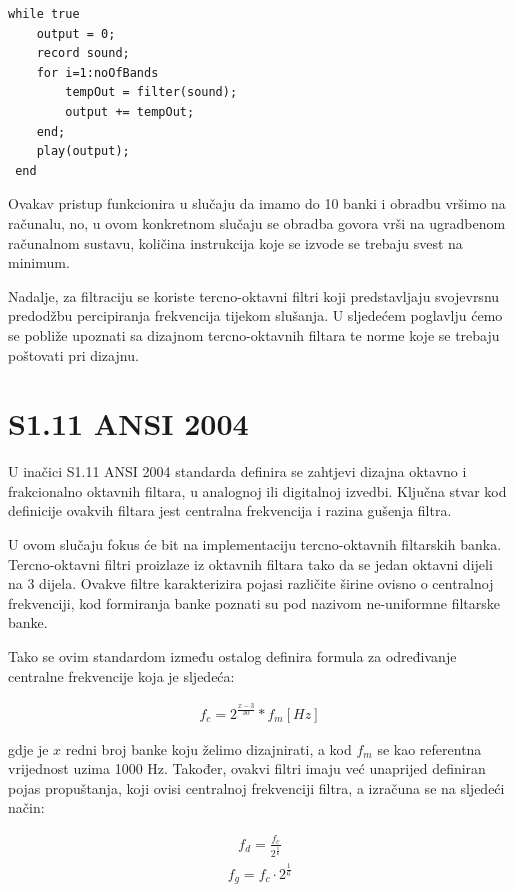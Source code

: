 \documentclass[times, utf8, diplomski]{fer}
\begin{document}
\begin{lstlisting} 
while true
	output = 0;
    record sound;
    for i=1:noOfBands
    	tempOut = filter(sound);
    	output += tempOut;
  	end;
  	play(output);
 end
\end{lstlisting}

Ovakav pristup funkcionira u slučaju da imamo do 10 banki i obradbu vršimo na računalu, no, u ovom konkretnom slučaju se obradba govora vrši na ugradbenom računalnom sustavu, količina instrukcija koje se izvode se trebaju svest na minimum.

Nadalje, za filtraciju se koriste tercno-oktavni filtri koji predstavljaju svojevrsnu predodžbu percipiranja frekvencija tijekom slušanja. U sljedećem poglavlju ćemo se pobliže upoznati sa dizajnom tercno-oktavnih filtara te norme koje se trebaju poštovati pri dizajnu.

\section{S1.11 ANSI 2004}
U inačici S1.11 ANSI 2004 standarda definira se zahtjevi dizajna oktavno i frakcionalno oktavnih filtara, u analognoj ili digitalnoj izvedbi. Ključna stvar kod definicije ovakvih filtara jest centralna frekvencija i razina gušenja filtra.

U ovom slučaju fokus će bit na implementaciju tercno-oktavnih filtarskih banka. Tercno-oktavni filtri proizlaze iz oktavnih filtara tako da se jedan oktavni dijeli na 3 dijela. Ovakve filtre karakterizira pojasi različite širine ovisno o centralnoj frekvenciji, kod formiranja banke poznati su pod nazivom ne-uniformne filtarske banke.

Tako se ovim standardom između ostalog definira formula za određivanje centralne frekvencije koja je sljedeća:

\begin{equation}
\begin{aligned}
f_c = 2^\frac{x-3}{30}*f_m   [Hz]
\end{aligned}
\end{equation}

gdje je $x$ redni broj banke koju želimo dizajnirati, a kod $f_m$ se kao referentna vrijednost uzima 1000 Hz. Također, ovakvi filtri imaju već unaprijed definiran pojas propuštanja, koji ovisi centralnoj frekvenciji filtra, a izračuna se na sljedeći način:

\begin{equation}
\begin{aligned}
f_d = \frac{f_c}{2^\frac{1}{6}}
\end{aligned}
\end{equation}
\begin{equation}
\begin{aligned}
f_g = f_c \cdot 2^\frac{1}{6}
\end{aligned}
\end{equation}
\end{document}
